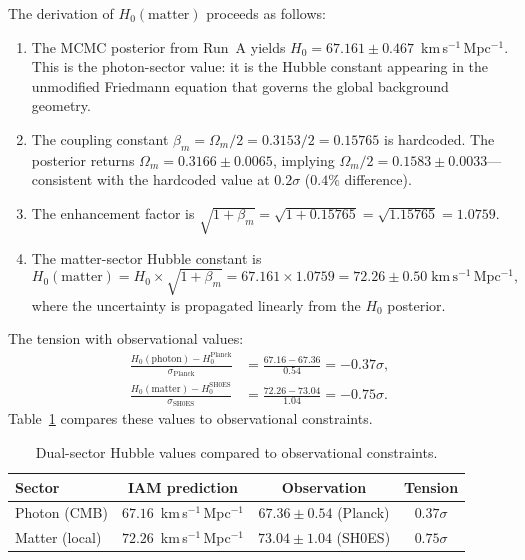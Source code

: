 \documentclass[11pt]{article}
\begin{document}
The derivation of $H_0(\mathrm{matter})$ proceeds as follows:
\begin{enumerate}
\item The MCMC posterior from Run~A yields
  $H_0 = 67.161 \pm 0.467$~km\,s$^{-1}$\,Mpc$^{-1}$.
  This is the photon-sector value: it is the Hubble constant
  appearing in the unmodified Friedmann equation that governs
  the global background geometry.
\item The coupling constant $\beta_m = \Omega_m/2 = 0.3153/2 = 0.15765$
  is hardcoded.  The posterior returns
  $\Omega_m = 0.3166 \pm 0.0065$, implying
  $\Omega_m/2 = 0.1583 \pm 0.0033$---consistent with the hardcoded
  value at $0.2\sigma$ ($0.4\%$ difference).
\item The enhancement factor is
  $\sqrt{1 + \beta_m} = \sqrt{1 + 0.15765} = \sqrt{1.15765} = 1.0759$.
\item The matter-sector Hubble constant is
  \begin{equation}
  H_0(\mathrm{matter}) = H_0 \times \sqrt{1 + \beta_m}
  = 67.161 \times 1.0759 = 72.26 \pm 0.50\;\mathrm{km\,s^{-1}\,Mpc^{-1}},
  \label{eq:H0_matter_numerical}
  \end{equation}
  where the uncertainty is propagated linearly from the $H_0$ posterior.
\end{enumerate}
The tension with observational values:
\begin{align}
\frac{H_0(\mathrm{photon}) - H_0^\mathrm{Planck}}{\sigma_\mathrm{Planck}}
  &= \frac{67.16 - 67.36}{0.54} = -0.37\sigma, \label{eq:tension_planck}\\
\frac{H_0(\mathrm{matter}) - H_0^\mathrm{SH0ES}}{\sigma_\mathrm{SH0ES}}
  &= \frac{72.26 - 73.04}{1.04} = -0.75\sigma. \label{eq:tension_shoes}
\end{align}
Table~\ref{tab:hubble_comparison} compares these values to
observational constraints.

\begin{table}[h]
\centering
\caption{Dual-sector Hubble values compared to observational
constraints.}
\begin{tabular}{lccc}
\toprule
Sector & IAM prediction & Observation & Tension \\
\midrule
Photon (CMB)
  & $67.16$~km\,s$^{-1}$\,Mpc$^{-1}$
  & $67.36 \pm 0.54$ (Planck)
  & $0.37\sigma$ \\
Matter (local)
  & $72.26$~km\,s$^{-1}$\,Mpc$^{-1}$
  & $73.04 \pm 1.04$ (SH0ES)
  & $0.75\sigma$ \\
\bottomrule
\end{tabular}
\label{tab:hubble_comparison}
\end{table}
\end{document}
